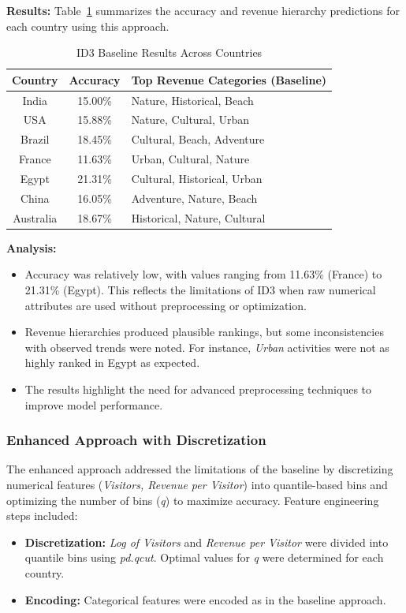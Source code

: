 \documentclass{article}
\begin{document}
\textbf{Results:} Table~\ref{tab:id3_baseline_results} summarizes the accuracy and revenue hierarchy predictions for each country using this approach.

\begin{table}[h!]
    \centering
    \begin{tabular}{|c|c|l|}
        \hline
        \textbf{Country} & \textbf{Accuracy} & \textbf{Top Revenue Categories (Baseline)} \\ \hline
        India & 15.00\% & Nature, Historical, Beach \\
        USA & 15.88\% & Nature, Cultural, Urban \\
        Brazil & 18.45\% & Cultural, Beach, Adventure \\
        France & 11.63\% & Urban, Cultural, Nature \\
        Egypt & 21.31\% & Cultural, Historical, Urban \\
        China & 16.05\% & Adventure, Nature, Beach \\
        Australia & 18.67\% & Historical, Nature, Cultural \\ \hline
    \end{tabular}
    \caption{ID3 Baseline Results Across Countries}
    \label{tab:id3_baseline_results}
\end{table}

\textbf{Analysis:}
\begin{itemize}
    \item Accuracy was relatively low, with values ranging from 11.63\% (France) to 21.31\% (Egypt). This reflects the limitations of ID3 when raw numerical attributes are used without preprocessing or optimization.
    \item Revenue hierarchies produced plausible rankings, but some inconsistencies with observed trends were noted. For instance, \textit{Urban} activities were not as highly ranked in Egypt as expected.
    \item The results highlight the need for advanced preprocessing techniques to improve model performance.
\end{itemize}

\subsubsection{Enhanced Approach with Discretization}
The enhanced approach addressed the limitations of the baseline by discretizing numerical features (\textit{Visitors, Revenue per Visitor}) into quantile-based bins and optimizing the number of bins (\textit{q}) to maximize accuracy. Feature engineering steps included:
\begin{itemize}
    \item \textbf{Discretization:} \textit{Log of Visitors} and \textit{Revenue per Visitor} were divided into quantile bins using \textit{pd.qcut}. Optimal values for \textit{q} were determined for each country.
    \item \textbf{Encoding:} Categorical features were encoded as in the baseline approach.
\end{itemize}
\end{document}

